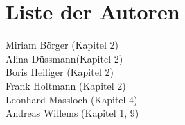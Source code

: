 \chapter*{Liste der Autoren}
Miriam Börger (Kapitel 2)\\
Alina Düssmann(Kapitel 2)\\
Boris Heiliger (Kapitel 2)\\
Frank Holtmann (Kapitel 2)\\
Leonhard Massloch (Kapitel 4)\\
Andreas Willems (Kapitel 1, 9)
